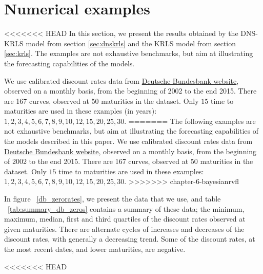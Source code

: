 \section{Numerical examples}
\label{sec:numericalexamples}

<<<<<<< HEAD
In this section, we present the results obtained by the DNS-KRLS model from section \ref{sec:dnskrls} and the KRLS model from section \ref{sec:krls}. The examples are not exhaustive benchmarks, but aim at illustrating the forecasting capabilities of the models. 

\medskip

We use calibrated discount rates data from \textcolor{blue}{\href{http://www.bundesbank.de/Navigation/EN/Statistics/Time_series_databases/time_series_databases.html}{Deutsche Bundesbank website}}, observed on a monthly basis, from the beginning of 2002 to the end 2015. There are 167 curves, observed at 50 maturities in the dataset. Only $15$ time to maturities are used in these examples (in years): $1, 2, 3, 4, 5, 6, 7, 8, 9, 10, 12, 15, 20, 25, 30$. 
=======
The following examples are not exhaustive benchmarks, but aim at illustrating the forecasting capabilities of the models described in this paper. We use calibrated discount rates data from \href{http://www.bundesbank.de/Navigation/EN/Statistics/Time_series_databases/time_series_databases.html}{Deutsche Bundesbank website}, observed on a monthly basis, from the beginning of 2002 to the end 2015. There are 167 curves, observed at 50 maturities in the dataset. Only $15$ time to maturities are used in these examples: $1, 2, 3, 4, 5, 6, 7, 8, 9, 10, 12, 15, 20, 25, 30$. 
>>>>>>> chapter-6-bayesianrvfl

\medskip

In figure ~\ref{db_zerorates}, we present the data that we use, and table ~\ref{tab:summary_db_zeros} contains a summary of these data; the minimum, maximum, median, first and third quartiles of the discount rates observed at given maturities. There are alternate cycles of increases and decreases of the discount rates, with generally a decreasing trend. Some of the discount rates, at the most recent dates, and lower maturities, are negative.

<<<<<<< HEAD

